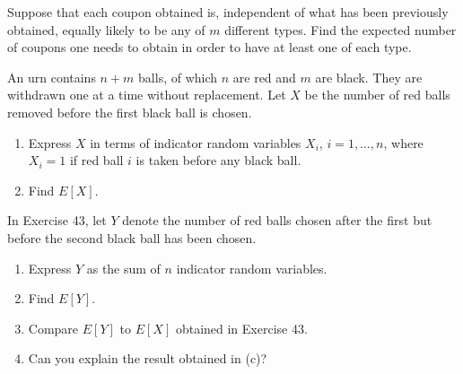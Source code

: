 \begin{exercise}
\label{ex:random-variables-42}
Suppose that each coupon obtained is, independent of what has been previously obtained, equally likely to be any of $m$ different types. Find the expected number of coupons one needs to obtain in order to have at least one of each type.
\end{exercise}


\begin{exercise}
\label{ex:random-variables-43}
An urn contains $n+m$ balls, of which $n$ are red and $m$ are black. They are withdrawn one at a time without replacement. Let $X$ be the number of red balls removed before the first black ball is chosen.
\begin{enumerate}
    \item [(a)] Express $X$ in terms of indicator random variables $X_i$, $i = 1,\ldots,n$, where $X_i = 1$ if red ball $i$ is taken before any black ball.
    \item  [(b)] Find $E[X]$.
\end{enumerate}
\end{exercise}


\begin{exercise}
\label{ex:random-variables-44}
In Exercise 43, let $Y$ denote the number of red balls chosen after the first but before the second black ball has been chosen.
\begin{enumerate}
    \item [(a)] Express $Y$ as the sum of $n$ indicator random variables.
    \item [(b)] Find $E[Y]$.
    \item [(c)] Compare $E[Y]$ to $E[X]$ obtained in Exercise 43.
    \item [(d)]Can you explain the result obtained in (c)?
\end{enumerate}
\end{exercise}

